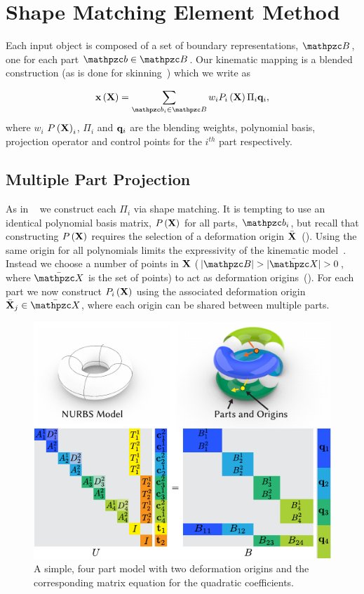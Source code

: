 \section{Shape Matching Element Method}
 Each input object is composed of a set of boundary representations, $\Prts$, one for each part $\prt\in\Prts$. 
 Our kinematic mapping is a blended construction (as is done for skinning~\cite{10.1145/2614028.2615427}) which we write as

 \begin{equation}
    \defX\left(\refX\right) = \sum_{\prt_i\in\Prts} \bld_i\Pmatxi\Pi_i\vc{q}_i, 
    \label{eq:kinematics}
 \end{equation} where $w_i$ $P\left(\mathbf{X}\right)_i$, $\Pi_i$ and $\mathbf{q}_i$ are the blending weights, polynomial basis, projection operator and control points for the $i^{th}$
 part respectively.  
 
 \subsection*{Multiple Part Projection}
As in ~ we construct each $\Pi_i$ via shape matching. 
It is tempting to use an identical polynomial basis matrix, $P\left(\mathbf{X}\right)$ for all parts, $\prt_i$, but recall that constructing $P\left(\mathbf{X}\right)$ requires the selection of a deformation
origin $\bar{\mathbf{X}}$~(). 
Using the same origin for all polynomials limits the expressivity of the kinematic model~\cite{STBS:2011}.
Instead we choose a number of points in $\mathbf{X}$ ($|\Prts| > |\XBs| > 0$, where $\XBs$ is the set of points)  to act as deformation origins~().
For each part we now construct $P_i\left(\mathbf{X} \right)$ using the associated deformation origin $\bar{\refX}_j\in \XBs$, where each origin can
be shared between multiple parts.

\begin{figure}[h]
    \includegraphics[width=\columnwidth]{figures/projection_operator_solve}
    \caption{A simple, four part model with two deformation origins and the corresponding matrix equation for the quadratic coefficients.}
    \label{fig:multiparts}
\end{figure}


